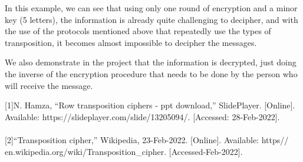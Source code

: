 \documentclass[twoside,twocolumn]{article}
\begin{document}
In this example, we can see that using only one round of encryption and a minor key (5 letters), the information is already quite challenging to decipher, and with the use of the protocols mentioned above that repeatedly use the types of transposition, it becomes almost impossible to decipher the messages.

We also demonstrate in the project that the information is decrypted, just doing the inverse of the encryption procedure that needs to be done by the person who will receive the message. \\ 

\vspace*{20.0cm}
\begin{thebibliography}{} %

\footnotesize[1]N. Hamza, “Row transposition ciphers - ppt download,” SlidePlayer. [Online]. Available: https://slideplayer.com/slide/13205094/. [Accessed: 28-Feb-2022].  \\ \\

\footnotesize[2]“Transposition cipher,” Wikipedia, 23-Feb-2022. [Online]. Available: https\:// en.wikipedia.org/wiki/Transposition\_cipher. [Accessed-Feb-2022]. \\ \\


 
\end{thebibliography}


\end{document}
